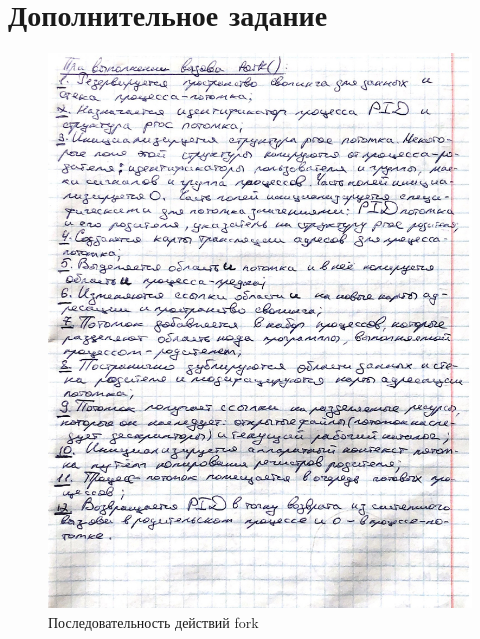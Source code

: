 \documentclass[12pt]{report}
\begin{document}
\newpage
\section*{Дополнительное задание}
\begin{figure}[H]
	\centering
	\includegraphics[scale = 0.8]{1.jpg}
	\caption{Последовательность действий fork}
	\label{task05:demo}
\end{figure}
\end{document}
